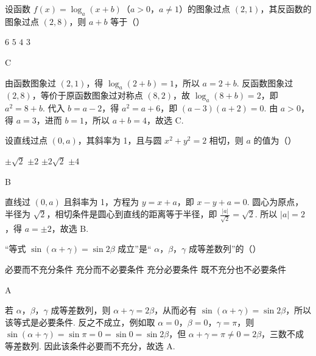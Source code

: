 \begin{problem}
设函数 \( f(x) = \log_a (x + b) \)（\(a > 0\)，\(a \neq 1\)）的图象过点 \((2,1)\)，其反函数的图象过点 \((2,8)\)，则 \( a + b \) 等于（\quad）

\choices
    {\(6\)}
    {\(5\)}
    {\(4\)}
    {\(3\)}
\end{problem}

\begin{answer}
C
\end{answer}

\begin{solution}
由函数图象过 \((2,1)\)，得 \(\log_a(2+b)=1\)，所以 \(a=2+b\). 反函数图象过 \((2,8)\)，等价于原函数图象过对称点 \((8,2)\)，故 \(\log_a(8+b)=2\)，即 \(a^2=8+b\). 代入 \(b=a-2\)，得 \(a^2=a+6\)，即 \((a-3)(a+2)=0\). 由 \(a>0\)，得 \(a=3\)，进而 \(b=1\)，所以 \(a+b=4\)，故选 C.
\end{solution}

\begin{problem}
设直线过点 \((0, a)\)，其斜率为 1，且与圆 \(x^{2} + y^{2} = 2\) 相切，则 \(a\) 的值为（\quad）

\choices
    {\(\pm \sqrt{2}\)}
    {\(\pm 2\)}
    {\(\pm 2\sqrt{2}\)}
    {\(\pm 4\)}
\end{problem}

\begin{answer}
B
\end{answer}

\begin{solution}
直线过 \((0,a)\) 且斜率为 1，方程为 \(y=x+a\)，即 \(x-y+a=0\). 圆心为原点，半径为 \(\sqrt2\)，相切条件是圆心到直线的距离等于半径，即 \(\frac{|a|}{\sqrt2}=\sqrt2\). 所以 \(|a|=2\)，得 \(a=\pm2\)，故选 B.
\end{solution}

\begin{problem}
“等式 \( \sin(\alpha+\gamma)=\sin2\beta \) 成立”是“ \(\alpha\)，\(\beta\)，\(\gamma\) 成等差数列”的（\quad）

\choices
    {必要而不充分条件}
    {充分而不必要条件}
    {充分必要条件}
    {既不充分也不必要条件}
\end{problem}

\begin{answer}
A
\end{answer}

\begin{solution}
若 \(\alpha\)，\(\beta\)，\(\gamma\) 成等差数列，则 \(\alpha+\gamma=2\beta\)，从而必有 \(\sin(\alpha+\gamma)=\sin2\beta\)，所以该等式是必要条件. 反之不成立，例如取 \(\alpha=0\)，\(\beta=0\)，\(\gamma=\pi\)，则 \(\sin(\alpha+\gamma)=\sin\pi=0=\sin0=\sin2\beta\)，但 \(\alpha+\gamma=\pi\ne0=2\beta\)，三数不成等差数列. 因此该条件必要而不充分，故选 A.
\end{solution}

